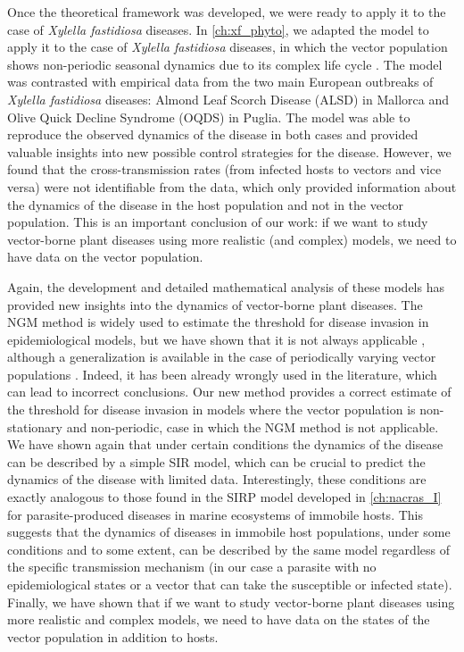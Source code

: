 Once the theoretical framework was developed, we were ready to apply it to the
case of \textit{Xylella fastidiosa} diseases. In \cref{ch:xf_phyto}, we adapted
the model to apply it to the case of \textit{Xylella fastidiosa} diseases, in
which the vector population shows non-periodic seasonal dynamics due to its
complex life cycle \cite{GimenezRomero2023}. The model was contrasted with
empirical data from the two main European outbreaks of \textit{Xylella
    fastidiosa} diseases: Almond Leaf Scorch Disease (ALSD) in Mallorca and
Olive Quick Decline Syndrome (OQDS) in Puglia. The model was able to reproduce
the observed dynamics of the disease in both cases and provided valuable
insights into new possible control strategies for the disease. However, we
found that the cross-transmission rates (from infected hosts to vectors and
vice versa) were not identifiable from the data, which only provided
information about the dynamics of the disease in the host population and not in
the vector population. This is an important conclusion of our work: if we want
to study vector-borne plant diseases using more realistic (and complex) models,
we need to have data on the vector population.

Again, the development and detailed mathematical analysis of these models has
provided new insights into the dynamics of vector-borne plant diseases. The NGM
method is widely used to estimate the threshold for disease invasion in
epidemiological models, but we have shown that it is not always applicable
\cite{GimenezRomero2022_PRE}, although a generalization is available in the
case of periodically varying vector populations \cite{Bacaer2006}.
Indeed, it has been already wrongly used in the literature, which can lead to
incorrect conclusions. Our new method provides a correct estimate of the
threshold for disease invasion in models where the vector population is
non-stationary and non-periodic, case in which the NGM method is not
applicable. We have shown again that under certain conditions the dynamics of
the disease can be described by a simple SIR model, which can be crucial to
predict the dynamics of the disease with limited data. Interestingly, these
conditions are exactly analogous to those found in the SIRP model developed in
\cref{ch:nacras_I} for parasite-produced diseases in marine ecosystems of
immobile hosts. This suggests that the dynamics of diseases in immobile host
populations, under some conditions and to some extent, can be described by the
same model regardless of the specific transmission mechanism (in our case a
parasite with no epidemiological states or a vector that can take the
susceptible or infected state). Finally, we have shown that if we want to study
vector-borne plant diseases using more realistic and complex models, we need to
have data on the states of the vector population in addition to hosts.

